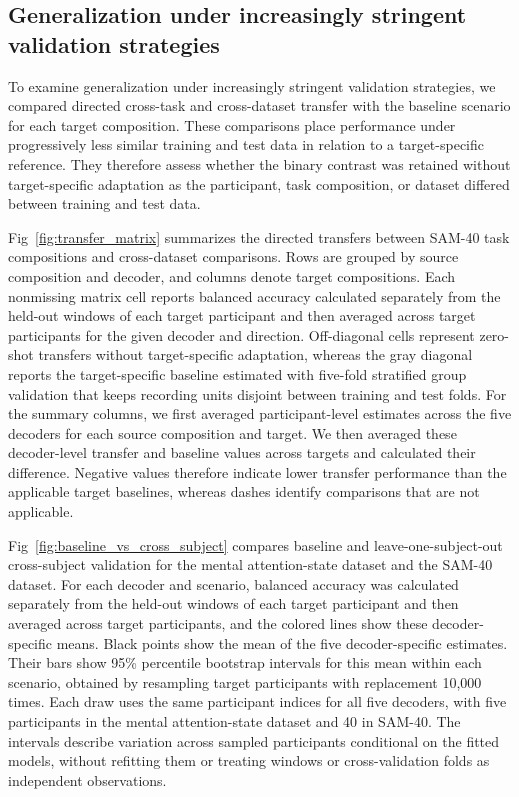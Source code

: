 \documentclass[10pt,letterpaper]{article}
\begin{document}


\subsection*{Generalization under increasingly stringent validation strategies}

To examine generalization under increasingly stringent validation strategies,
we compared directed cross-task and cross-dataset transfer with the
baseline scenario for each target composition. These comparisons place
performance under progressively less similar training and test data in relation
to a target-specific reference. They therefore assess whether the binary
contrast was retained without target-specific adaptation as the participant,
task composition, or dataset differed between training and test data.

Fig~\ref{fig:transfer_matrix} summarizes the directed transfers between SAM-40 task compositions and
cross-dataset comparisons. Rows are grouped by source composition and decoder,
and columns denote target compositions. Each nonmissing matrix cell reports
balanced accuracy calculated separately from the held-out windows of each
target participant and then averaged across target participants for the given
decoder and direction. Off-diagonal cells represent zero-shot transfers without
target-specific adaptation, whereas the gray diagonal reports the
target-specific baseline estimated with five-fold stratified group validation
that keeps recording units disjoint between training and test folds. For the
summary columns, we first averaged
participant-level estimates across the five decoders for each source composition and target. We then
averaged these decoder-level transfer and baseline values across targets and
calculated their difference.
Negative values therefore indicate lower transfer performance than the
applicable target baselines, whereas dashes identify comparisons that are not
applicable.

Fig~\ref{fig:baseline_vs_cross_subject} compares baseline and
leave-one-subject-out cross-subject validation for the mental attention-state
dataset and the SAM-40 dataset. For each decoder and scenario, balanced accuracy was
calculated separately from the held-out windows of each target participant and
then averaged across target participants, and the colored lines show these
decoder-specific means. Black points show the mean of the five decoder-specific
estimates. Their bars show 95\% percentile bootstrap intervals for this mean within
each scenario, obtained by resampling target participants with replacement
10,000 times. Each draw uses the same participant indices for all five
decoders, with five participants in the mental attention-state dataset and
40 in SAM-40. The intervals describe variation across sampled participants
conditional on the fitted models, without refitting them or treating windows
or cross-validation folds as independent observations.
\end{document}
